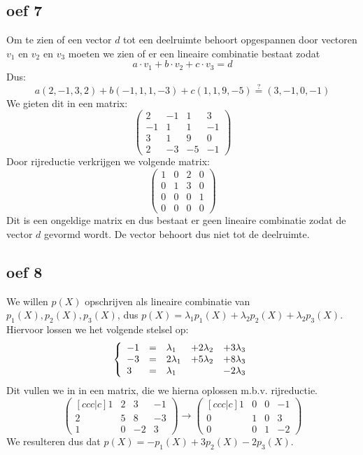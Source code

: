 \documentclass[lineaire_algebra_oplossingen.tex]{subfiles}
\begin{document}
\subsection*{oef 7}
Om te zien of een vector $d$ tot een deelruimte behoort opgespannen door vectoren $v_1$ en $v_2$ en $v_3$ moeten we zien of er een lineaire combinatie bestaat zodat  $$a\cdot v_1 + b\cdot v_2 + c\cdot v_3 = d$$
Dus:
$$a(2,-1,3,2) + b(-1,1,1,-3) + c(1,1,9,-5) \overset{?}{=} (3,-1,0,-1)$$
We gieten dit in een matrix:
$$
\begin{pmatrix}
2 & -1 & 1 &3\\
-1 & 1 & 1 & -1\\
3 & 1 &9 & 0\\
2 & -3 &-5& -1
\end{pmatrix}
$$
Door rijreductie verkrijgen we volgende matrix:
$$
\begin{pmatrix}
1&0&2&0\\
0&1&3&0\\
0&0&0&1\\
0&0&0&0
\end{pmatrix}
$$
Dit is een ongeldige matrix en dus bestaat er geen lineaire combinatie zodat de vector $d$ gevormd wordt. De vector behoort dus niet tot de deelruimte.

\subsection*{oef 8}
We willen $p(X)$ opschrijven als lineaire combinatie van $p_1(X), p_2(X), p_3(X)$, dus $p(X) = \lambda_1 p_1(X) + \lambda_2 p_2(X) + \lambda_2 p_3(X)$.
Hiervoor lossen we het volgende stelsel op:
\[
\left\{
\begin{array}{l l l l l}
  -1 &= &\lambda_1 &+ 2 \lambda_2 &+ 3 \lambda_3\\
  -3 &= &2 \lambda_1 &+ 5 \lambda_2 &+ 8 \lambda_3\\
  3 &= &\lambda_1 &&- 2 \lambda_3
\end{array}
\right.
\]
Dit vullen we in in een matrix, die we hierna oplossen m.b.v. rijreductie.
\[
\begin{pmatrix}[ccc|c]
  1 & 2 & 3 & -1\\
  2 & 5 & 8 & -3\\
  1 & 0 & -2 & 3
\end{pmatrix}
\rightarrow
\begin{pmatrix}[ccc|c]
  1 & 0 & 0 & -1\\
  0 & 1 & 0 & 3\\
  0 & 0 & 1 & -2
\end{pmatrix}
\]
We resulteren dus dat $p(X) = - p_1(X) + 3 p_2(X) - 2 p_3(X)$.
\end{document}
